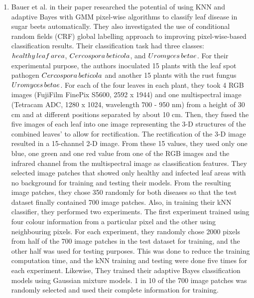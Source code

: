 \begin{enumerate}
\begin{figure}[htbp]
        \label{fig:k_clusterd}
    \end{figure}


\item Bauer et al. \cite{bauer2011potential} in their paper researched the potential of using  KNN and adaptive Bayes with GMM pixel-wise algorithms to classify leaf disease in sugar beets automatically. They also investigated the use of conditional random fields (CRF) global labelling approach to improving pixel-wise-based classification results. Their classification task had three classes: $healthy \thinspace leaf \thinspace area$, $Cercospora \thinspace beticola$, and $Uromyces \thinspace betae$. For their experimental purpose, the authors inoculated 15 plants with the leaf spot pathogen $Cercospora \thinspace beticola$ and another 15 plants with the rust fungus $Uromyces \thinspace betae$. For each of the four leaves in each plant, they took 4 RGB images (FujiFilm FinePix S5600, 2592 x 1944) and one multispectral image (Tetracam ADC, 1280 x 1024, wavelength 700 - 950 nm) from a height of 30 cm and at different positions separated by about 10 cm. Then, they fused the five images of each leaf into one image representing the 3-D structures of the combined leaves’ to allow for rectification. The rectification of the 3-D image resulted in a 15-channel 2-D image. From these 15 values, they used only one blue, one green and one red value from one of the RGB images and the infrared channel from the multispectral image as classification features. They selected image patches that showed only healthy and infected leaf areas with no background for training and testing their models. From the resulting image patches, they chose 350 randomly for both diseases so that the test dataset finally contained 700 image patches. Also, in training their kNN classifier, they performed two experiments. The first experiment trained using four colour information from a particular pixel and the other using neighbouring pixels. For each experiment, they randomly chose 2000 pixels from half of the  700 image patches in the test dataset for training, and the other half was used for testing purposes. This was done to reduce the training computation time, and the kNN training and testing were done five times for each experiment. Likewise, They trained their adaptive Bayes classification models using Gaussian mixture models. 1 in 10 of the 700 image patches was randomly selected and used their complete information for training.

\end{enumerate}
